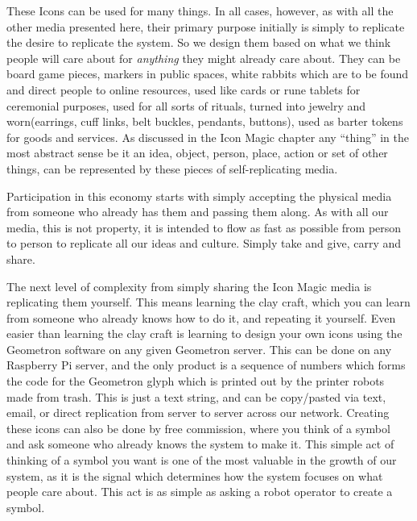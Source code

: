 These Icons can be used for many things. In all cases, however, as with
all the other media presented here, their primary purpose initially is
simply to replicate the desire to replicate the system. So we design
them based on what we think people will care about for \emph{anything}
they might already care about. They can be board game pieces, markers in
public spaces, white rabbits which are to be found and direct people to
online resources, used like cards or rune tablets for ceremonial
purposes, used for all sorts of rituals, turned into jewelry and
worn(earrings, cuff links, belt buckles, pendants, buttons), used as
barter tokens for goods and services. As discussed in the Icon Magic
chapter any ``thing'' in the most abstract sense be it an idea, object,
person, place, action or set of other things, can be represented by
these pieces of self-replicating media.

Participation in this economy starts with simply accepting the physical
media from someone who already has them and passing them along. As with
all our media, this is not property, it is intended to flow as fast as
possible from person to person to replicate all our ideas and culture.
Simply take and give, carry and share.

The next level of complexity from simply sharing the Icon Magic media is
replicating them yourself. This means learning the clay craft, which you
can learn from someone who already knows how to do it, and repeating it
yourself. Even easier than learning the clay craft is learning to design
your own icons using the Geometron software on any given Geometron
server. This can be done on any Raspberry Pi server, and the only
product is a sequence of numbers which forms the code for the Geometron
glyph which is printed out by the printer robots made from trash. This
is just a text string, and can be copy/pasted via text, email, or direct
replication from server to server across our network. Creating these
icons can also be done by free commission, where you think of a symbol
and ask someone who already knows the system to make it. This simple act
of thinking of a symbol you want is one of the most valuable in the
growth of our system, as it is the signal which determines how the
system focuses on what people care about. This act is as simple as
asking a robot operator to create a symbol.

